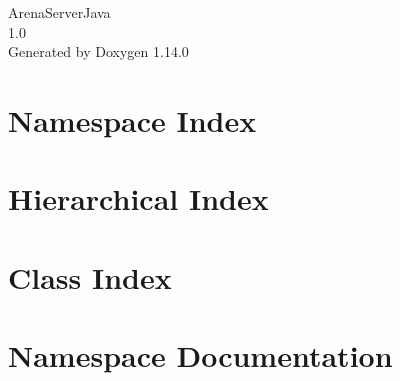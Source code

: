 \documentclass[twoside]{book}
\newcommand{\+}{\discretionary{\mbox{\scriptsize$\hookleftarrow$}}{}{}}
\newcommand{\clearemptydoublepage}{%
    \newpage{\pagestyle{empty}\cleardoublepage}%
  }
\begin{document}
  \raggedbottom
    \hypersetup{pageanchor=false,
                bookmarksnumbered=true,
                pdfencoding=unicode
               }
  \begin{titlepage}
  \vspace*{7cm}
  \begin{center}%
  {\Large Arena\+Server\+Java}\\
  [1ex]\large 1.\+0 \\
  \vspace*{1cm}
  {\large Generated by Doxygen 1.14.0}\\
  \end{center}
  \end{titlepage}
  \clearemptydoublepage
  \tableofcontents
  \clearemptydoublepage
  \hypersetup{pageanchor=true}
\chapter{Namespace Index}

\chapter{Hierarchical Index}

\chapter{Class Index}

\chapter{Namespace Documentation}

















\end{document}
